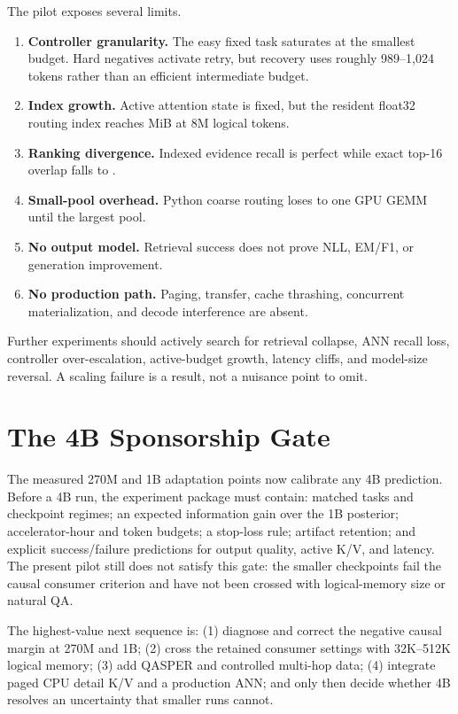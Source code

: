 \documentclass[10pt]{article}
\begin{document}
The pilot exposes several limits.
\begin{enumerate}
\item \textbf{Controller granularity.} The easy fixed task saturates at the
smallest budget. Hard negatives activate retry, but recovery uses roughly
989--1,024 tokens rather than an efficient intermediate budget.
\item \textbf{Index growth.} Active attention state is fixed, but the resident
float32 routing index reaches \PaperFiveIndexMiB{} MiB at 8M logical tokens.
\item \textbf{Ranking divergence.} Indexed evidence recall is perfect while exact
top-16 overlap falls to \PaperFiveExactOverlap{}.
\item \textbf{Small-pool overhead.} Python coarse routing loses to one GPU GEMM
until the largest pool.
\item \textbf{No output model.} Retrieval success does not prove NLL, EM/F1, or
generation improvement.
\item \textbf{No production path.} Paging, transfer, cache thrashing, concurrent
materialization, and decode interference are absent.
\end{enumerate}

Further experiments should actively search for retrieval collapse, ANN recall
loss, controller over-escalation, active-budget growth, latency cliffs, and
model-size reversal. A scaling failure is a result, not a nuisance point to omit.

\section{The 4B Sponsorship Gate}

The measured 270M and 1B adaptation points now calibrate any 4B prediction. Before a 4B run,
the experiment package must contain: matched tasks and checkpoint regimes; an
expected information gain over the 1B posterior; accelerator-hour and token
budgets; a stop-loss rule; artifact retention; and explicit success/failure
predictions for output quality, active K/V, and latency. The present pilot still
does not satisfy this gate: the smaller checkpoints fail the causal consumer
criterion and have not been crossed with logical-memory size or natural QA.

The highest-value next sequence is: (1) diagnose and correct the negative causal
margin at 270M and 1B; (2) cross the retained consumer settings with 32K--512K
logical memory; (3) add QASPER and controlled multi-hop data; (4) integrate paged
CPU detail K/V and a production ANN; and only then decide whether 4B resolves an
uncertainty that smaller runs cannot.
\end{document}
